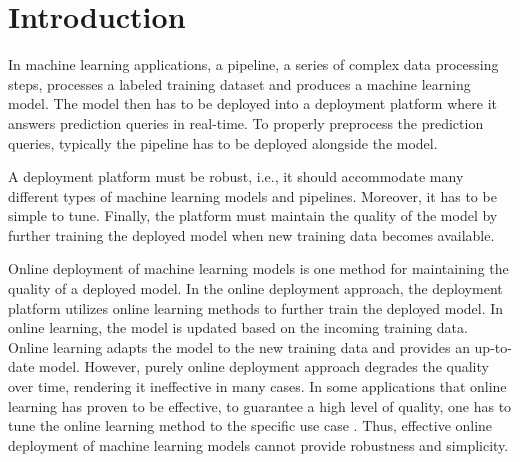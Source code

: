 \section{Introduction} \label{introduction}
In machine learning applications, a pipeline, a series of complex data processing steps, processes a labeled training dataset and produces a machine learning model.
The model then has to be deployed into a deployment platform where it answers prediction queries in real-time.
To properly preprocess the prediction queries, typically the pipeline has to be deployed alongside the model.

A deployment platform must be robust, i.e., it should accommodate many different types of machine learning models and pipelines.
Moreover, it has to be simple to tune.
Finally, the platform must maintain the quality of the model by further training the deployed model when new training data becomes available.

Online deployment of machine learning models is one method for maintaining the quality of a deployed model.
In the online deployment approach, the deployment platform utilizes online learning methods to further train the deployed model.
In online learning, the model is updated based on the incoming training data.
Online learning adapts the model to the new training data and provides an up-to-date model.
However, purely online deployment approach degrades the quality over time, rendering it ineffective in many cases.
In some applications that online learning has proven to be effective, to guarantee a high level of quality, one has to tune the online learning method to the specific use case \cite{ma2009identifying, macmahan2013}.
Thus, effective online deployment of machine learning models cannot provide robustness and simplicity.


